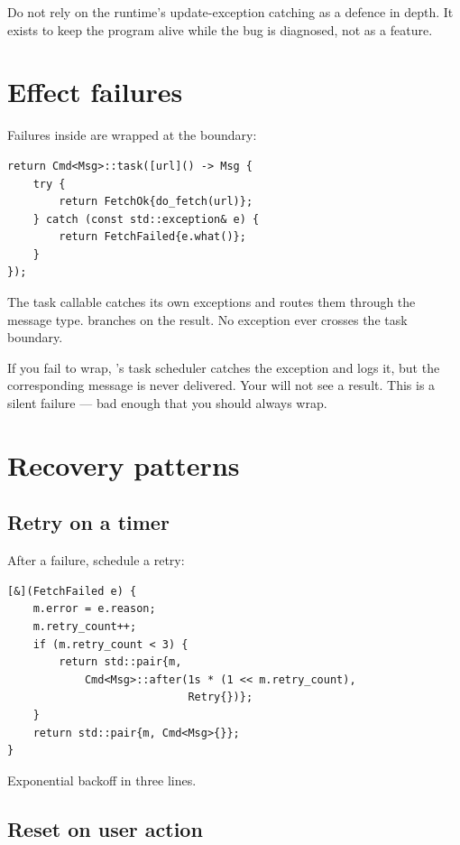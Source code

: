 \begin{warning}
Do not rely on the runtime's update-exception catching as a
defence in depth. It exists to keep the program alive while the
bug is diagnosed, not as a feature.
\end{warning}

\section{Effect failures}

Failures inside  are wrapped at the boundary:

\begin{lstlisting}
return Cmd<Msg>::task([url]() -> Msg {
    try {
        return FetchOk{do_fetch(url)};
    } catch (const std::exception& e) {
        return FetchFailed{e.what()};
    }
});
\end{lstlisting}

The task callable catches its own exceptions and routes them
through the message type.  branches on the result.
No exception ever crosses the task boundary.

If you fail to wrap, \maya{}'s task scheduler catches the
exception and logs it, but the corresponding message is never
delivered. Your  will not see a result. This is a
silent failure --- bad enough that you should always wrap.

\section{Recovery patterns}

\subsection*{Retry on a timer}

After a failure, schedule a retry:

\begin{lstlisting}
[&](FetchFailed e) {
    m.error = e.reason;
    m.retry_count++;
    if (m.retry_count < 3) {
        return std::pair{m,
            Cmd<Msg>::after(1s * (1 << m.retry_count),
                            Retry{})};
    }
    return std::pair{m, Cmd<Msg>{}};
}
\end{lstlisting}

Exponential backoff in three lines.

\subsection*{Reset on user action}

